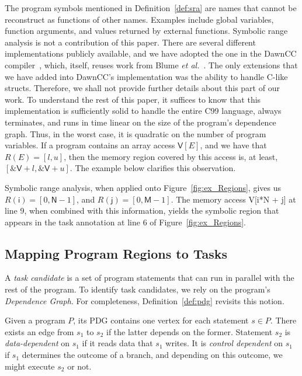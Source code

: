 \documentclass[sigplan,10pt,review,anonymous]{acmart}
\newcommand\dawn{\mbox{\textsf{DawnCC}}}
\begin{document}
The program symbols mentioned in Definition~\ref{def:sra} are names that cannot be
reconstruct as functions of other names.
Examples include global variables, function arguments, and values returned by
external functions.
Symbolic range analysis is not a contribution of this paper.
There are several different implementations publicly available, and we have
adopted the one in the \dawn{} compiler~\cite{Mendonca17}, which, itself,
reuses work from Blume {\em et al.}~\cite{Blume94}.
The only extensions that we have added into \dawn's implementation was
the ability to handle C-like \textsf{structs}.
Therefore, we shall not provide further details about this part of our work.
To understand the rest of this paper, it suffices to know that this implementation
is sufficiently solid to handle the entire C99 language, always terminates, and
runs in time linear on the size of the program's dependence graph.
Thus, in the worst case, it is quadratic on the number of program variables.
If a program contains an array access $\textsf{V}[E]$, and we have that
$R(E) = [l, u]$, then the memory region covered by this access is, at least,
$[\mathtt{\&}\textsf{V} + l, \mathtt{\&}\textsf{V} + u]$.
The example below clarifies this observation.

\begin{example}
\label{ex:sra}
Symbolic range analysis, when applied onto Figure~\ref{fig:ex_Regions}, gives us
$R(\mathsf{i}) = [0, \mathsf{N} - 1]$, and $R(\mathsf{j}) = [0, \mathsf{M} - 1]$.
The memory access \textsf{V[i*N + j]} at line 9, when combined with this
information, yields the symbolic region that appears in the task annotation at
line 6 of Figure~\ref{fig:ex_Regions}.
\end{example}

\subsection{Mapping Program Regions to Tasks}
\label{sub:identification}

A {\em task candidate} is a set of program statements that can run in parallel
with the rest of the program.
To identify task candidates, we rely on the program's
{\em Dependence Graph}.
For completeness, Definition~\ref{def:pdg} revisits this notion.

\begin{definition}
\label{def:pdg}
Given a program $P$, its PDG contains one vertex for each statement $s \in P$.
There exists an edge from $s_1$ to $s_2$ if the latter depends on the former.
Statement $s_2$ is {\em data-dependent} on $s_1$ if it reads data that $s_1$
writes.
It is {\em control dependent} on $s_1$ if $s_1$ determines the outcome of a
branch, and depending on this outcome, we might execute $s_2$ or not.
\end{definition}
\end{document}
